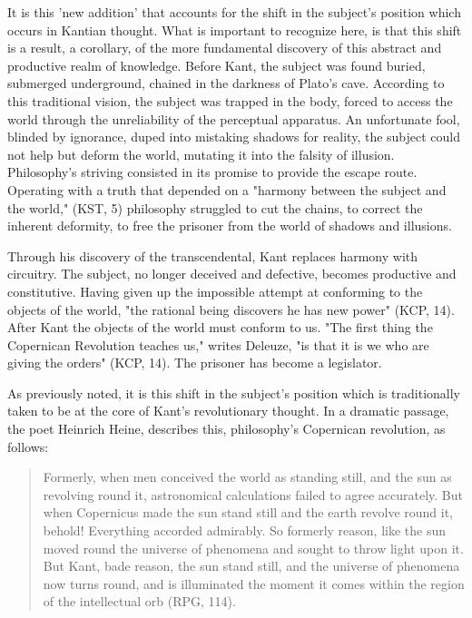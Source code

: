 It is this 'new addition' that accounts for the shift in the subject's position which occurs in Kantian thought. What is important to recognize here, is that this shift is a result, a corollary, of the more fundamental discovery of this abstract and productive realm of knowledge. Before Kant, the subject was found buried, submerged underground, chained in the darkness of Plato's cave. According to this traditional vision, the subject was trapped in the body, forced to access the world through the unreliability of the perceptual apparatus. An unfortunate fool, blinded by ignorance, duped into mistaking shadows for reality, the subject could not help but deform the world, mutating it into the falsity of illusion. Philosophy's striving consisted in its promise to provide the escape route. Operating with a truth that depended on a "harmony between the subject and the world," (KST, 5) philosophy struggled to cut the chains, to correct the inherent deformity, to free the prisoner from the world of shadows and illusions. 

Through his discovery of the transcendental, Kant replaces harmony with circuitry. The subject, no longer deceived and defective, becomes productive and constitutive. Having given up the impossible attempt at conforming to the objects of the world, "the rational being discovers he has new power" (KCP, 14). After Kant the objects of the world must conform to us. "The first thing the Copernican Revolution teaches us," writes Deleuze, "is that it is we who are giving the orders" (KCP, 14). The prisoner has become a legislator. 

As previously noted, it is this shift in the subject's position which is traditionally taken to be at the core of Kant's revolutionary thought. In a dramatic passage, the poet Heinrich Heine, describes this, philosophy's Copernican revolution, as follows:

\begin{quote}
    Formerly, when men conceived the world as standing still, and the sun as revolving round it, astronomical calculations failed to agree accurately. But when Copernicus made the sun stand still and the earth revolve round it, behold! Everything accorded admirably. So formerly reason, like the sun moved round the universe of phenomena and sought to throw light upon it. But Kant, bade reason, the sun stand still, and the universe of phenomena now turns round, and is illuminated the moment it comes within the region of the intellectual orb (RPG, 114).
\end{quote}

